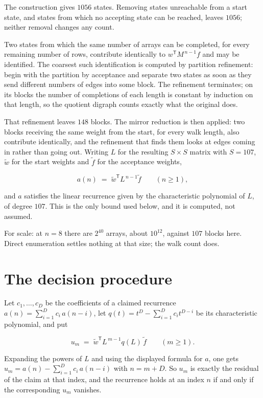 \documentclass[11pt]{article}
\theoremstyle{definition}
\begin{document}
The construction gives $1056$ states. Removing states unreachable from a start state, and states from which no accepting state can be reached, leaves $1056$; neither removal changes any count.

Two states from which the same number of arrays can be completed, for every remaining number of rows, contribute identically to $w^{\mathsf T}M^{\,n-1}f$ and may be identified. The coarsest such identification is computed by partition refinement: begin with the partition by acceptance and separate two states as soon as they send different numbers of edges into some block. The refinement terminates; on its blocks the number of completions of each length is constant by induction on that length, so the quotient digraph counts exactly what the original does.

That refinement leaves $148$ blocks. The mirror reduction is then applied: two blocks receiving the same weight from the start, for every walk length, also contribute identically, and the refinement that finds them looks at edges coming in rather than going out. Writing $L$ for the resulting $S \times S$ matrix with $S = 107$, $\tilde w$ for the start weights and $\tilde f$ for the acceptance weights,

\[a(n) \;=\; \tilde w^{\mathsf T} L^{\,n-1} \tilde f \qquad (n \ge 1),\]

and $a$ satisfies the linear recurrence given by the characteristic polynomial of $L$, of degree $107$. This is the only bound used below, and it is computed, not assumed.

For scale: at $n = 8$ there are $2^{40}$ arrays, about $10^{12}$, against $107$ blocks here. Direct enumeration settles nothing at that size; the walk count does.

\section{The decision procedure}

Let $c_1,\dots,c_D$ be the coefficients of a claimed recurrence $a(n) = \sum_{i=1}^{D} c_i\,a(n-i)$, let $q(t) = t^{D} - \sum_{i=1}^{D} c_i t^{D-i}$ be its characteristic polynomial, and put

\[u_m \;=\; \tilde w^{\mathsf T} L^{\,m-1} q(L)\,\tilde f \qquad (m \ge 1).\]

Expanding the powers of $L$ and using the displayed formula for $a$, one gets $u_m = a(n) - \sum_{i=1}^{D} c_i\,a(n-i)$ with $n = m + D$. So $u_m$ is exactly the residual of the claim at that index, and the recurrence holds at an index $n$ if and only if the corresponding $u_m$ vanishes.
\end{document}
